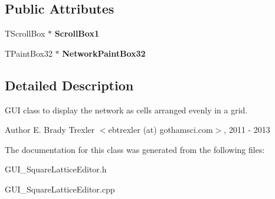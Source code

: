 \subsection*{Public Attributes}
\begin{DoxyCompactItemize}
\item 
\hypertarget{class_t_g_u_i___square_lattice_form_ae5c8a74b0d65b15e50a93748e8e7fd63}{T\+Scroll\+Box $\ast$ {\bfseries Scroll\+Box1}}\label{class_t_g_u_i___square_lattice_form_ae5c8a74b0d65b15e50a93748e8e7fd63}

\item 
\hypertarget{class_t_g_u_i___square_lattice_form_a0c50a6424633ee7c0b083fe5613b16f6}{T\+Paint\+Box32 $\ast$ {\bfseries Network\+Paint\+Box32}}\label{class_t_g_u_i___square_lattice_form_a0c50a6424633ee7c0b083fe5613b16f6}

\end{DoxyCompactItemize}


\subsection{Detailed Description}
G\+U\+I class to display the network as cells arranged evenly in a grid. 

\begin{DoxyAuthor}{Author}
E. Brady Trexler $<$ebtrexler (at) gothamsci.\+com$>$, 2011 -\/ 2013 
\end{DoxyAuthor}


The documentation for this class was generated from the following files\+:\begin{DoxyCompactItemize}
\item 
G\+U\+I\+\_\+\+Square\+Lattice\+Editor.\+h\item 
G\+U\+I\+\_\+\+Square\+Lattice\+Editor.\+cpp\end{DoxyCompactItemize}
